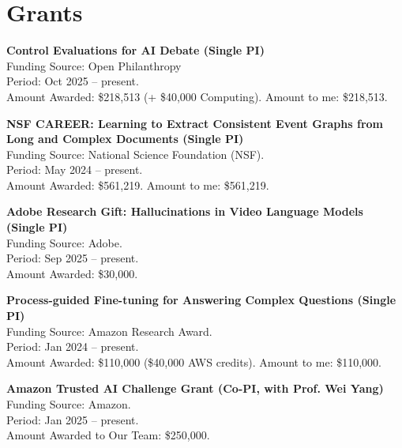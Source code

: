 \section{Grants}



\noindent \textbf{Control Evaluations for AI Debate (Single PI)} \\ 
\noindent Funding Source: Open Philanthropy \\
\indent Period: Oct 2025 -- present. \\ 
\indent Amount Awarded: \$218,513 (+ \$40,000 Computing). Amount to me: \$218,513. 



\noindent \textbf{NSF CAREER: Learning to Extract Consistent Event Graphs from Long and Complex Documents (Single PI)} \\ 
\indent Funding Source: National Science Foundation (NSF). \\
\indent Period: May 2024 -- present. \\ 
\indent Amount Awarded: \$561,219. Amount to me: \$561,219. 

\noindent \textbf{Adobe Research Gift: Hallucinations in Video Language Models (Single PI)} \\
\indent Funding Source: Adobe. \\
\indent Period: Sep 2025 -- present. \\
\indent Amount Awarded: \$30,000.

\noindent \textbf{Process-guided Fine-tuning for Answering Complex Questions (Single PI)}  \\
\indent Funding Source: Amazon Research Award. \\
\indent Period: Jan 2024 -- present. \\
\indent Amount Awarded: \$110,000 (\$40,000 AWS credits). Amount to me: \$110,000.


\noindent \textbf{Amazon Trusted AI Challenge Grant (Co-PI, with Prof. Wei Yang)} \\
\indent Funding Source: Amazon. \\
\indent Period: Jan 2025 -- present. \\
\indent Amount Awarded to Our Team: \$250,000.

